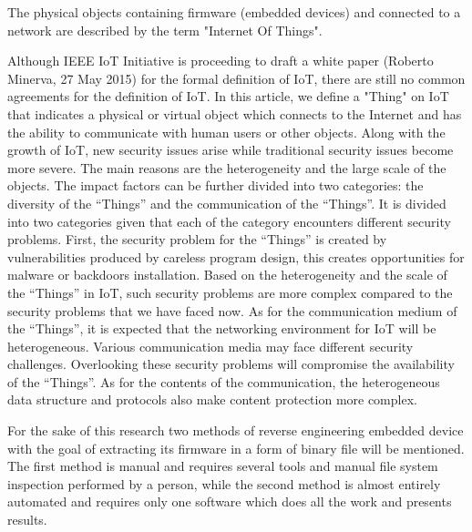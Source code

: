 \documentclass[]{report}
\begin{document}
\begin{center}
The physical objects containing firmware (embedded devices) and connected to a network are described by the term "Internet Of Things".

Although IEEE IoT Initiative is proceeding to draft a white
paper (Roberto Minerva, 27 May 2015) for the formal definition of IoT, there are still no
common agreements for the definition of IoT. In this article,
we define a "Thing" on IoT that indicates a physical or
virtual object which connects to the Internet and has the
ability to communicate with human users or other objects.
Along with the growth of IoT, new security issues arise
while traditional security issues become more severe. The
main reasons are the heterogeneity and the large scale of the
objects. The impact factors can be further divided into two
categories: the diversity of the “Things” and the
communication of the “Things”. It is divided into two
categories given that each of the category encounters
different security problems.
First, the security problem for the “Things” is created by
vulnerabilities produced by careless program design, this
creates opportunities for malware or backdoors installation.
Based on the heterogeneity and the scale of the “Things” in
IoT, such security problems are more complex compared to
the security problems that we have faced now.
As for the communication medium of the “Things”, it is
expected that the networking environment for IoT will be
heterogeneous. Various communication media may face
different security challenges. Overlooking these security
problems will compromise the availability of the “Things”.
As for the contents of the communication, the heterogeneous
data structure and protocols also make content protection more complex.

For the sake of this research two methods of reverse engineering embedded device with the goal of extracting its firmware in a form of binary file will be mentioned. The first method is manual and requires several tools and manual file system inspection performed by a person, while the second method is almost entirely automated and requires only one software which does all the work and presents results.


\end{center}
\end{document}
